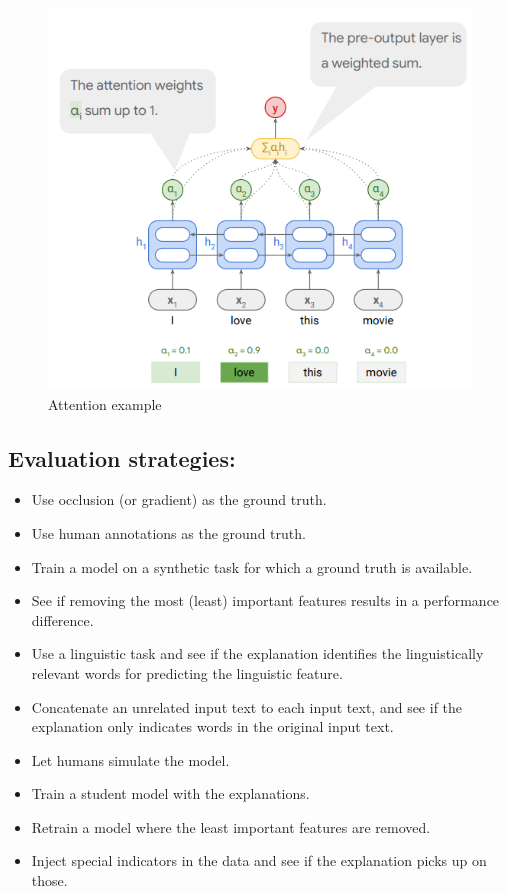 \documentclass[
  11pt,
  british,
]{article}
\providecommand{\tightlist}{%
  \setlength{\itemsep}{0pt}\setlength{\parskip}{0pt}}
\begin{document}
\begin{figure}
\centering
\includegraphics{Pasted_image_20220606165657.png}
\caption{Attention example}
\end{figure}

\hypertarget{evaluation-strategies}{%
\subsection{Evaluation strategies:}\label{evaluation-strategies}}

\begin{itemize}
\tightlist
\item
  Use occlusion (or gradient) as the ground truth.
\item
  Use human annotations as the ground truth.
\item
  Train a model on a synthetic task for which a ground truth is
  available.
\item
  See if removing the most (least) important features results in a
  performance difference.
\item
  Use a linguistic task and see if the explanation identifies the
  linguistically relevant words for predicting the linguistic feature.
\item
  Concatenate an unrelated input text to each input text, and see if the
  explanation only indicates words in the original input text.
\item
  Let humans simulate the model.
\item
  Train a student model with the explanations.
\item
  Retrain a model where the least important features are removed.
\item
  Inject special indicators in the data and see if the explanation picks
  up on those.
\end{itemize}
\end{document}
